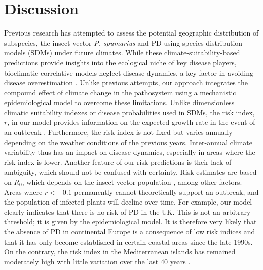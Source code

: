 \section{Discussion}

Previous research has attempted to assess the potential geographic
distribution of  \xf{} subspecies, the insect vector \textit{P. spumarius} and
PD using species distribution models (SDMs) under future climates. While these
climate-suitability-based predictions provide insights into the ecological
niche of key disease players, bioclimatic correlative models neglect disease
dynamics, a key factor in avoiding disease overestimation
\cite{GimenezRomero2022_CommsBio}. Unlike previous attempts, our approach
integrates
the compound effect of climate change in the pathosystem using a mechanistic
epidemiological model to overcome these limitations.  Unlike dimensionless
climatic suitability indexes or disease probabilities used in SDMs, the risk
index, $r$, in our model provides information on the expected growth rate in
the event of an outbreak . Furthermore, the risk index is not fixed but varies
annually depending on the weather conditions of the previous years.
Inter-annual climate variability thus has an impact on disease dynamics,
especially in areas where the risk index is lower.  Another feature of our risk
predictions is their lack of ambiguity, which should not be confused with
certainty. Risk estimates are based on $R_0$, which depends on the insect
vector population \cite{GimenezRomero2022_PRE}, among other factors. Areas
where
$r<-0.1$ permanently cannot theoretically support an outbreak, and the
population of infected plants will decline over time. For example, our model
clearly indicates that there is no risk of PD in the UK. This is not an
arbitrary threshold; it  is given by the epidemiological model.  It is
therefore very likely that the absence of PD in continental Europe is a
consequence of low risk indices and that it has only become established in
certain coastal areas since the late 1990s. On the contrary, the risk index in
the Mediterranean islands has remained moderately high with little variation
over the last 40 years \cite{GimenezRomero2022_CommsBio}.

